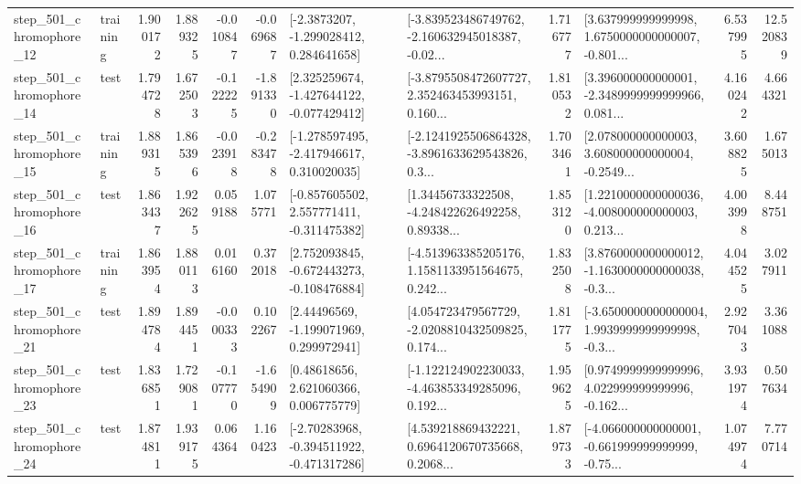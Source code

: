 \begin{tabular}{llrrrrllrlrr}
  step\_501\_chromophore\_12 &  training &      1.900172 &    1.889325 &     -0.010847 & -0.069687 &     [-2.3873207, -1.299028412, 0.284641658] &  [-3.839523486749762, -2.160632945018387, -0.02... &       1.716777 &  [3.637999999999998, 1.6750000000000007, -0.801... &            6.537995 &         12.520839 \\
  step\_501\_chromophore\_14 &      test &      1.794728 &    1.672503 &     -0.122225 & -1.891330 &   [2.325259674, -1.427644122, -0.077429412] &  [-3.8795508472607727, 2.352463453993151, 0.160... &       1.810532 &  [3.396000000000001, -2.3489999999999966, 0.081... &            4.160242 &          4.664321 \\
  step\_501\_chromophore\_15 &  training &      1.889315 &    1.865396 &     -0.023918 & -0.283478 &   [-1.278597495, -2.417946617, 0.310020035] &  [-2.1241925506864328, -3.8961633629543826, 0.3... &       1.703461 &  [2.078000000000003, 3.608000000000004, -0.2549... &            3.608825 &          1.675013 \\
  step\_501\_chromophore\_16 &      test &      1.863437 &    1.922625 &      0.059188 &  1.075771 &   [-0.857605502, 2.557771411, -0.311475382] &  [1.34456733322508, -4.248422626492258, 0.89338... &       1.853120 &  [1.2210000000000036, -4.008000000000003, 0.213... &            4.003998 &          8.448751 \\
  step\_501\_chromophore\_17 &  training &      1.863954 &    1.880113 &      0.016160 &  0.372018 &   [2.752093845, -0.672443273, -0.108476884] &  [-4.513963385205176, 1.1581133951564675, 0.242... &       1.832508 &  [3.8760000000000012, -1.1630000000000038, -0.3... &            4.044525 &          3.027911 \\
  step\_501\_chromophore\_21 &      test &      1.894784 &    1.894451 &     -0.000333 &  0.102267 &     [2.44496569, -1.199071969, 0.299972941] &  [4.054723479567729, -2.0208810432509825, 0.174... &       1.811775 &  [-3.6500000000000004, 1.9939999999999998, -0.3... &            2.927043 &          3.361088 \\
  step\_501\_chromophore\_23 &      test &      1.836851 &    1.729081 &     -0.107770 & -1.654909 &      [0.48618656, 2.621060366, 0.006775779] &  [-1.122124902230033, -4.463853349285096, 0.192... &       1.959625 &  [0.9749999999999996, 4.022999999999996, -0.162... &            3.931974 &          0.507634 \\
  step\_501\_chromophore\_24 &      test &      1.874811 &    1.939175 &      0.064364 &  1.160423 &   [-2.70283968, -0.394511922, -0.471317286] &  [4.539218869432221, 0.6964120670735668, 0.2068... &       1.879733 &  [-4.066000000000001, -0.661999999999999, -0.75... &            1.074974 &          7.770714 \\

\end{tabular}
